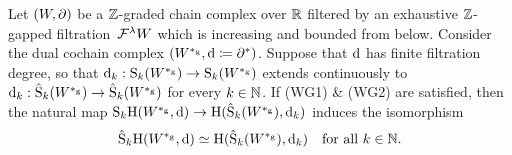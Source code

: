 \documentclass[\MainFolder/Text.tex]{subfiles}
\begin{document}
\begin{Proposition}\label{Prop:Kuenneth}
Let $(W,\partial)$ be a $\mathbb{Z}$-graded chain complex over $\mathbb{R}$ filtered by an exhaustive $\mathbb{Z}$-gapped filtration~$\mathcal{F}^\lambda W$ which is increasing and bounded from below. Consider the dual cochain complex $(W^{*_{\mathrm{g}}},\mathrm{d}\coloneqq \partial^*)$. Suppose that $\mathrm{d}$ has finite filtration degree, so that $\mathrm{d}_k: \mathrm{S}_k(W^{*_{\mathrm{g}}}) \rightarrow \mathrm{S}_k(W^{*_{\mathrm{g}}})$ extends continuously to $\mathrm{d}_k : \hat{\mathrm{S}}_k(W^{*_{\mathrm{g}}}) \rightarrow \hat{\mathrm{S}}_k(W^{*_{\mathrm{g}}})$ for every $k\in \mathbb{N}$. If (WG1) \& (WG2) are satisfied, then the natural map $\mathrm{S}_k \mathrm{H}(W^{*_{\mathrm{g}}},\mathrm{d}) \rightarrow \mathrm{H}(\hat{\mathrm{S}}_k(W^{*_{\mathrm{g}}}),\mathrm{d}_k)$ induces the isomorphism
\begin{equation*}
\hat{\mathrm{S}}_k \mathrm{H}(W^{*_{\mathrm{g}}},\mathrm{d}) \simeq \mathrm{H}(\hat{\mathrm{S}}_k(W^{*_{\mathrm{g}}}), \mathrm{d}_k)\quad \text{for all }k\in \mathbb{N}.
\end{equation*}
\end{Proposition}
\end{document}

